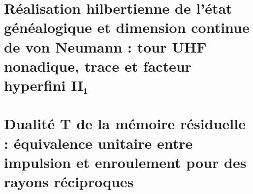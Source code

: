 \chapter{Réalisation hilbertienne de l'état généalogique et dimension continue de von Neumann : tour UHF nonadique, trace et facteur hyperfini II₁}
\label{chap:sucesor-102-23}



















\chapter{Dualité T de la mémoire résiduelle : équivalence unitaire entre impulsion et enroulement pour des rayons réciproques}
\label{chap:sucesor-102-24}
\label{chap:dualidad-t-memoria-residual}

\begingroup
\newcount\HMTFZeroEightThreeSubsection
{}
\let\HMTFZeroEightThreeOriginalSubsection\subsection
\renewcommand{\subsection}[1]{%
  \advance\HMTFZeroEightThreeSubsection by 1
  \ifnum\HMTFZeroEightThreeSubsection=3
    \HMTFZeroEightThreeOriginalSubsection{Extension opératorielle d'APP : séparation entre modes visibles et modes de mémoire}%
  \else
    \HMTFZeroEightThreeOriginalSubsection{#1}%
  \fi
}

\endgroup













